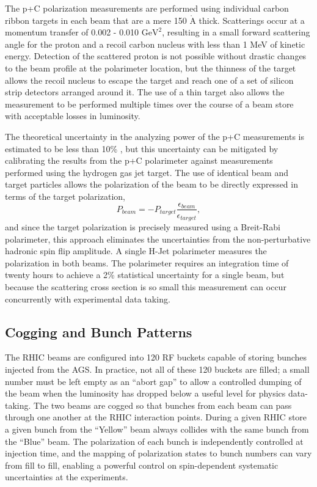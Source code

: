 The p+C polarization measurements are performed using individual carbon ribbon
targets in each beam that are a mere 150 $\mathrm{\mathring{A}}$ thick.
Scatterings occur at a momentum transfer of 0.002 - 0.010 $\mathrm{GeV}^2$,
resulting in a small forward scattering angle for the proton and a recoil
carbon nucleus with less than 1 MeV of kinetic energy. Detection of the
scattered proton is not possible without drastic changes to the beam profile
at the polarimeter location, but the thinness of the target allows the recoil
nucleus to escape the target and reach one of a set of silicon strip detectors
arranged around it. The use of a thin target also allows the measurement to be
performed multiple times over the course of a beam store with acceptable
losses in luminosity.

The theoretical uncertainty in the analyzing power of the p+C measurements is
estimated to be less than 10\% \cite{Alekseev:2003sk}, but this uncertainty
can be mitigated by calibrating the results from the p+C polarimeter against
measurements performed using the hydrogen gas jet target. The use of identical
beam and target particles allows the polarization of the beam to be directly
expressed in terms of the target polarization,
%
\begin{equation}
  P_{beam} = -P_{target}\frac{\epsilon_{beam}}{\epsilon_{target}},
\end{equation}
%
and since the target polarization is precisely measured using a Breit-Rabi
polarimeter, this approach eliminates the uncertainties from the
non-perturbative hadronic spin flip amplitude. A single H-Jet polarimeter
measures the polarization in both beams. The polarimeter requires an
integration time of twenty hours to achieve a 2\% statistical uncertainty for
a single beam, but because the scattering cross section is so small this
measurement can occur concurrently with experimental data taking.

\subsection{Cogging and Bunch Patterns}

The RHIC beams are configured into 120 RF buckets capable of storing bunches
injected from the AGS. In practice, not all of these 120 buckets are filled; a
small number must be left empty as an ``abort gap'' to allow a controlled
dumping of the beam when the luminosity has dropped below a useful level for
physics data-taking. The two beams are cogged so that bunches from each beam
can pass through one another at the RHIC interaction points. During a given
RHIC store a given bunch from the ``Yellow'' beam always collides with the
same bunch from the ``Blue'' beam. The polarization of each bunch is
independently controlled at injection time, and the mapping of polarization
states to bunch numbers can vary from fill to fill, enabling a powerful
control on spin-dependent systematic uncertainties at the experiments.

